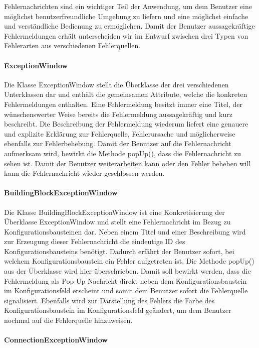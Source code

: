 \documentclass[parskip=full]{scrartcl}
\begin{document}
Fehlernachrichten sind ein wichtiger Teil der Anwendung, um dem Benutzer eine möglichst benutzerfreundliche Umgebung zu liefern und eine möglichst einfache und verständliche Bedienung zu ermöglichen. Damit der Benutzer aussagekräftige Fehlermeldungen erhält unterscheiden wir im Entwurf zwischen drei Typen von Fehlerarten aus verschiedenen Fehlerquellen.

\paragraph{ExceptionWindow}

Die Klasse ExceptionWindow stellt die Überklasse der drei verschiedenen Unterklassen dar und enthält die gemeinsamen Attribute, welche die konkreten Fehlermeldungen enthalten. Eine Fehlermeldung besitzt immer eine Titel, der wünschenswerter Weise bereits die Fehlermeldung aussagekräftig und kurz beschreibt. Die Beschreibung der Fehlermeldung wiederum liefert eine genauere und explizite Erklärung zur Fehlerquelle, Fehlerursache und möglicherweise ebenfalls zur Fehlerbehebung.
Damit der Benutzer auf die Fehlernachricht aufmerksam wird, bewirkt die Methode popUp(), dass die Fehlernachricht zu sehen ist. Damit der Benutzer weiterarbeiten kann oder den Fehler beheben will kann die Fehlernachricht wieder geschlossen werden.

\paragraph{BuildingBlockExceptionWindow}

Die Klasse BuildingBlockExceptionWindow ist eine Konkretisierung der Überklasse ExceptionWindow und stellt eine Fehlernachricht im Bezug zu Konfigurationsbausteinen dar. Neben einem Titel und einer Beschreibung wird zur Erzeugung dieser Fehlernachricht die eindeutige ID des Konfigurationsbausteins benötigt. Dadurch erfährt der Benutzer sofort, bei welchem Konfigurationsbaustein ein Fehler aufgetreten ist. Die Methode popUp() aus der Überklasse wird hier überschrieben. Damit soll bewirkt werden, dass die Fehlermeldung als Pop-Up Nachricht direkt neben dem Konfigurationsbaustein im Konfigurationsfeld erscheint und somit dem Benutzer sofort die Fehlerquelle signalisiert. Ebenfalls wird zur Darstellung des Fehlers die Farbe des Konfigurationsbaustein im Konfigurationsfeld geändert, um dem Benutzer nochmal auf die Fehlerquelle hinzuweisen.

\paragraph{ConnectionExceptionWindow}
\end{document}
